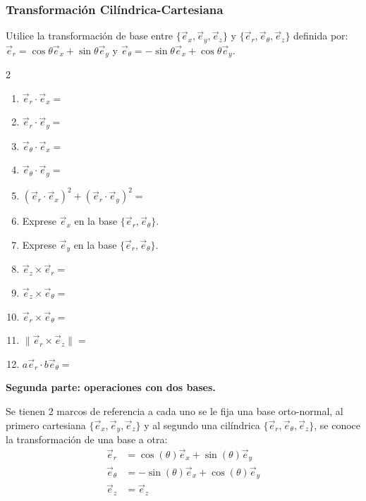 \subsubsection{Transformación Cilíndrica-Cartesiana}
Utilice la transformación de base entre $\{\vec{e}_x, \vec{e}_y, \vec{e}_z\}$ y $\{\vec{e}_r, \vec{e}_\theta, \vec{e}_z\}$ definida por:
$\vec{e}_r = \cos\theta\vec{e}_x + \sin\theta\vec{e}_y$ y $\vec{e}_\theta = -\sin\theta\vec{e}_x + \cos\theta\vec{e}_y$.

\begin{multicols}{2}
\begin{enumerate}
    \item $\vec{e}_r \cdot \vec{e}_x =$
    \item $\vec{e}_r \cdot \vec{e}_y =$
    \item $\vec{e}_\theta \cdot \vec{e}_x =$
    \item $\vec{e}_\theta \cdot \vec{e}_y =$
    \item $(\vec{e}_r \cdot \vec{e}_x)^2 + (\vec{e}_r \cdot \vec{e}_y)^2 =$
    \item Exprese $\vec{e}_x$ en la base $\{\vec{e}_r, \vec{e}_\theta\}$.
    \item Exprese $\vec{e}_y$ en la base $\{\vec{e}_r, \vec{e}_\theta\}$.
    \item $\vec{e}_z \times \vec{e}_r =$
    \item $\vec{e}_z \times \vec{e}_\theta =$
    \item $\vec{e}_r \times \vec{e}_\theta =$
    \item $\| \vec{e}_r \times \vec{e}_z \| =$
    \item $a\vec{e}_r \cdot b\vec{e}_\theta =$
\end{enumerate}
\end{multicols}
\textbf{Segunda parte: operaciones con dos bases.}\label{subsec:cilindrica}

Se tienen 2 marcos de referencia a cada uno  se le fija una base orto-normal, al primero cartesiana $\{\Vec{e}_x,\Vec{e}_y,\Vec{e}_z\}$ y al segundo una cilíndrica $\{\Vec{e}_r,\Vec{e}_\theta,\Vec{e}_z\}$, se conoce la transformación de una base a otra: 
\begin{equation*}
\begin{split}
    \Vec{e}_r&=\cos(\theta)\Vec{e}_x+\sin(\theta)\Vec{e}_y\\
    \Vec{e}_\theta&=-\sin(\theta)\Vec{e}_x+\cos(\theta)\Vec{e}_y\\
    \Vec{e}_z&=\Vec{e}_z
\end{split}
\end{equation*}


